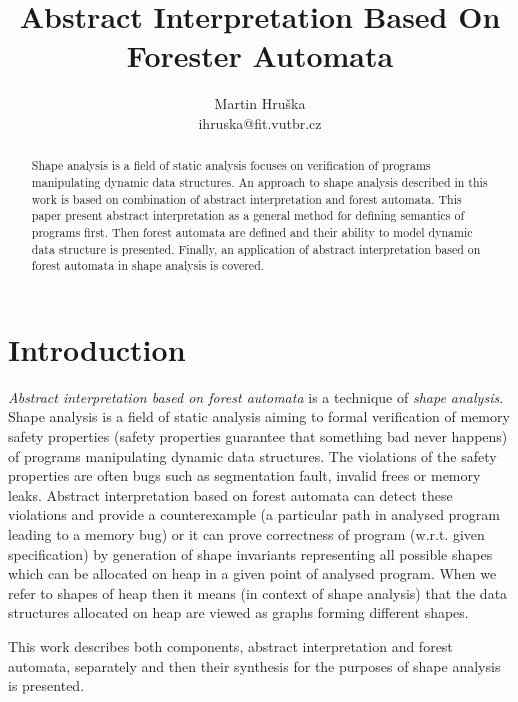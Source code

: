 \documentclass[a4paper, 12pt]{article}
\title{Abstract Interpretation Based On Forester Automata}
\author{Martin Hruška\\ihruska@fit.vutbr.cz}
\date{}
\begin{document}
\maketitle

\begin{abstract}
Shape analysis is a field of static analysis focuses on verification of
programs manipulating dynamic data structures.
An approach to shape analysis described in this work
is based on combination of abstract interpretation and forest automata.
This paper present abstract interpretation as a general method
for defining semantics of programs first.
Then forest automata are defined and their ability
to model dynamic data structure is presented.
Finally, an application of abstract interpretation based on
forest automata in shape analysis is covered. 
\end{abstract}

\tableofcontents

\section{Introduction}
\label{sec:intro}

\emph{Abstract interpretation based on forest automata} is a technique of \emph{shape analysis}.
Shape analysis is a field of static analysis aiming to
formal verification of memory safety properties (safety properties
guarantee that something bad never happens) of
programs manipulating dynamic data structures.
The violations of the safety properties are often bugs
such as segmentation fault, invalid frees or memory leaks.
Abstract interpretation based on forest automata can detect these violations
and provide a counterexample (a particular path in analysed program
leading to a memory bug) or it can prove correctness of program (w.r.t. given specification)
by generation of shape invariants representing all possible shapes which
can be allocated on heap in a given point of analysed program.
When we refer to shapes of heap then it means (in context of shape analysis)
that the data structures allocated on heap are viewed
as graphs forming different shapes.

This work describes both components, abstract interpretation
and forest automata, separately and then their
synthesis for the purposes of shape analysis is presented.
\end{document}
